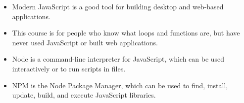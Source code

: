 \begin{itemize}
\item
  Modern JavaScript is a good tool for building desktop and web-based applications.
\item
  This course is for people who know what loops and functions are, but have never used JavaScript or built web applications.
\item
  Node is a command-line interpreter for JavaScript, which can be used interactively or to run scripts in files.
\item
  NPM is the Node Package Manager, which can be used to find, install, update, build, and execute JavaScript libraries.
\end{itemize}
